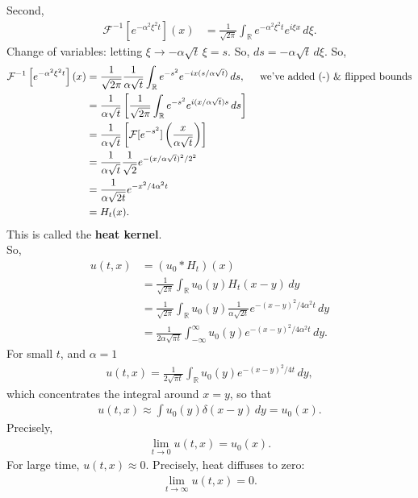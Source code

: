 \documentclass{book}
\theoremstyle{definition}
\newcommand{\R}{\mathbb{R}}
\newcommand{\F}{\mathcal{F}}
\newcommand{\al}{\alpha}
\newcommand{\f}[2]{\frac{#1}{#2}}
\newcommand{\ift}{\infty}
\newcommand{\lp}{\left(}
\newcommand{\rp}{\right)}
\newcommand{\lb}{\left[}
\newcommand{\rb}{\right]}
\begin{document}
Second,
\begin{align*}
\F^{-1}\lb e^{-\al^2\xi^2 t} \rb(x) &= \f{1}{\sqrt{2\pi}}\int_\R e^{-\al^2\xi^2 t}e^{i\xi x}\,d\xi.
\end{align*}
Change of variables: letting $\xi \to -\al\sqrt{t}\,\xi = s$. So, $ds = -\al \sqrt{t}\,d\xi$. So,
\begin{align*}
\F^{-1}\lb e^{-\al^2\xi^2 t} \rb(x) 
&= \f{1}{\sqrt{2\pi}} \f{1}{\al\sqrt{t}}\int_{\R}e^{-s^2}e^{-ix(s/\al\sqrt{t})}\,ds, \hspace{0.5cm}\text{we've added (-) \& flipped bounds}\\
&= \f{1}{\al\sqrt{t}}\lb \f{1}{\sqrt{2\pi}} \int_{\R}e^{-s^2}e^{i(x/\al\sqrt{t})s}\,ds \rb\\
&= \f{1}{\al\sqrt{t}}\lb \F[e^{-s^2}]\lp \f{x}{\al \sqrt{t}} \rp  \rb\\
&= \f{1}{\al\sqrt{t}}\f{1}{\sqrt{2}} e^{-(x/\al\sqrt{t})^2/2^2}\\
&= \frac{1}{\al \sqrt{2t}}e^{-x^2/4\al^2 t}\\
&= H_t(x).
\end{align*} 
This is called the \textbf{heat kernel}. \\

So,
\begin{align*}
u(t,x) &= (u_0 \ast H_t)(x)\\
&= \f{1}{\sqrt{2\pi}} \int_\R u_0(y)H_t(x-y)\,dy\\
&= \f{1}{\sqrt{2\pi}} \int_\R u_0(y)\frac{1}{\al \sqrt{2t}}e^{-(x-y)^2/4\al^2 t}\,dy\\
&= \f{1}{2\al\sqrt{\pi t}} \int^\ift_{-\ift} u_0(y)e^{-(x-y)^2/4\al^2 t}\,dy.
\end{align*}
For small $t$, and $\al = 1$
\begin{align*}
u(t,x) = \f{1}{2\sqrt{\pi t}}\int_\R u_0(y)e^{-(x-y)^2/4t}\,dy,
\end{align*}
which concentrates the integral around $x=y$, so that
\begin{align*}
u(t,x) \approx \int u_0(y)\delta(x-y)\,dy = u_0(x).
\end{align*}
Precisely, 
\begin{align*}
\lim_{t\to 0}u(t,x) = u_0(x).
\end{align*}
For large time, $u(t,x) \approx 0$. Precisely, heat diffuses to zero:
\begin{align*}
\lim_{t\to \ift}u(t,x) = 0.
\end{align*}


\end{document}
